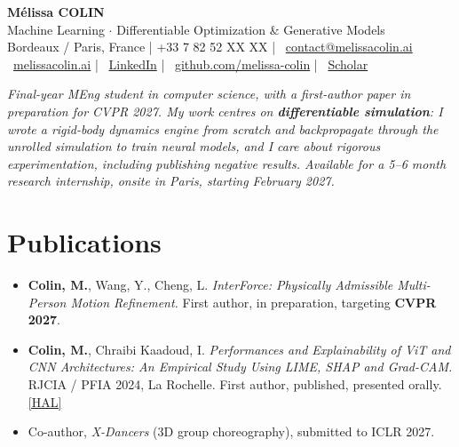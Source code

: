 \documentclass[10pt, letterpaper]{article}
\providecommand{\myphone}{+33 7 82 52 XX XX}
\begin{document}
\begin{center}
    {\fontsize{20}{20}\selectfont \textbf{Mélissa COLIN}} \\[3pt]
    {\large Machine Learning $\cdot$ Differentiable Optimization \& Generative Models} \\[4pt]

    \small{
    \faMapMarker* Bordeaux / Paris, France \quad|\quad
    \faPhone* \myphone{} \quad|\quad
    \faEnvelope~\href{mailto:contact@melissacolin.ai}{contact@melissacolin.ai} \\
    \faGlobe~\href{https://melissacolin.ai}{melissacolin.ai} \quad|\quad
    \faLinkedin~\href{https://www.linkedin.com/in/melissacolin/}{LinkedIn} \quad|\quad
    \faGithub~\href{https://github.com/melissa-colin}{github.com/melissa-colin} \quad|\quad
    \faGraduationCap~\href{https://scholar.google.com/citations?user=7r7iFpsAAAAJ}{Scholar}
    }
\end{center}

\vspace{2pt}

{\small \textit{Final-year MEng student in computer science, with a first-author paper in preparation for CVPR 2027. My work centres on \textbf{differentiable simulation}: I wrote a rigid-body
dynamics engine from scratch and backpropagate through the unrolled simulation to train
neural models, and I care about rigorous experimentation, including publishing negative results. Available
for a 5--6 month research internship, onsite in Paris, starting February 2027.}}

\section{Publications}
\begin{itemize}
    \item \textbf{Colin, M.}, Wang, Y., Cheng, L. \textit{InterForce: Physically Admissible Multi-Person Motion Refinement.} First author, in preparation, targeting \textbf{CVPR 2027}.
    \item \textbf{Colin, M.}, Chraibi Kaadoud, I. \textit{Performances and Explainability of ViT and CNN Architectures: An Empirical Study Using LIME, SHAP and Grad-CAM.} RJCIA / PFIA 2024, La Rochelle. First author, published, presented orally. \hfill \href{https://hal.science/hal-04641791}{[HAL]}
    \item Co-author, \textit{X-Dancers} (3D group choreography), submitted to ICLR 2027.
\end{itemize}
\end{document}
